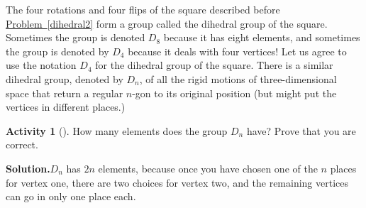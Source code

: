 \documentclass[10pt,]{book}
\theoremstyle{plain}
\theoremstyle{definition}
\newtheorem{activity}[project]{Activity}
\numberwithin{equation}{chapter}
\begin{document}
The four rotations and four flips of the square described before \hyperref[dihedral2]{Problem~\ref{dihedral2}} form a group called the dihedral group of the square. Sometimes the group is denoted \(D_8\) because it has eight elements, and sometimes the group is denoted by \(D_4\) because it deals with four vertices! Let us agree to use the notation \(D_4\) for the dihedral group of the square. There is a similar dihedral group, denoted by \(D_{n}\), of all the rigid motions of three-dimensional space that return a regular \(n\)-gon to its original position (but might put the vertices in different places.)%
\begin{activity}[]\label{activity-263}
How many elements does the group \(D_n\) have? Prove that you are correct.%
\par\medskip\noindent%
\textbf{Solution.}\quad \(D_n\) has \(2n\) elements, because once you have chosen one of the \(n\) places for vertex one, there are two choices for vertex two, and the remaining vertices can go in only one place each.%
\end{activity}
\typeout{************************************************}
\typeout{************************************************}
\end{document}
